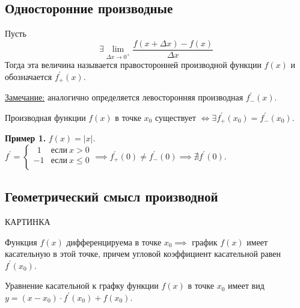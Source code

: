 \documentclass{article}
\begin{document}
\subsection*{Односторонние производные}

\begin{definition}
    Пусть \[\exists \lim\limits_{\Delta x \to 0^+} \frac{f(x + \Delta x) - f(x)}{\Delta x}\]
    Тогда эта величина называется правосторонней производной функции \(f(x)\) и обозначается \(f^{\prime}_{+}(x)\). 
\end{definition}
\noindent
\underline{Замечание:} аналогично определяется левосторонняя производная \(f^{\prime}_{-}(x)\).

\begin{claim}
    Производная функции \(f(x)\) в точке \(x_0\) существует \(\iff \exists f^{\prime}_{+}(x_0) = f^{\prime}_{-}(x_0)\). 
\end{claim}
\noindent
\textbf{Пример 1.} \(f(x) = \left\vert x \right\vert\). \(\displaystyle f^{\prime} =
\begin{cases}
    \ \ 1 & \text{если}\ x > 0\\
    -1 & \text{если}\ x \leq 0\\  
\end{cases} \implies 
f^{\prime}_{+}(0) \neq f^{\prime}_{-}(0) \implies \nexists f^{\prime}(0)\).

\begin{definition}
    
\end{definition}

\subsection*{Геометрический смысл производной}
{\color{red} КАРТИНКА}

\begin{theorem}
    Функция \(f(x)\) дифференцируема в точке \(x_0 \implies\) график \(f(x)\) имеет касательную в этой точке, причем угловой коэффициент касательной равен \(f^{\prime}(x_0)\). 
\end{theorem}

\begin{claim}
    Уравнение касательной к графку функции \(f(x)\) в точке \(x_0\) имеет вид \(y = (x - x_0) \cdot f^{\prime}(x_0) + f(x_0)\).   
\end{claim}
\end{document}
